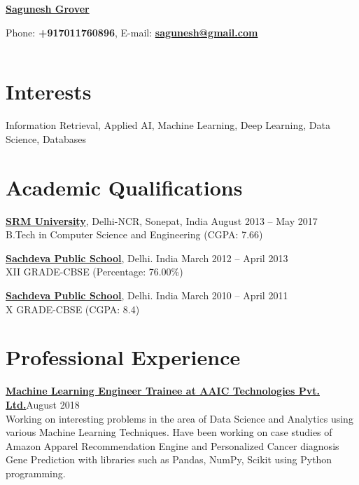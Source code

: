 \documentclass[margin,line]{res}
\begin{document}
\centerline{\LARGE  { \bf \href{https://saguneshgrover.com}{Sagunesh Grover} }} \hfill 
\centerline{{ Phone:}{ \bf +917011760896}, {E-mail:}{{ \href{mailto: sagunesh@gmail.com}{\bf sagunesh@gmail.com}}}\\}

\begin{resume}

\vspace{.005in}
\begin{tabular}{@{}p{3.5in}p{3in}}



\end{tabular}


\section{\sc Interests}

Information Retrieval, Applied AI, Machine Learning, Deep Learning, Data Science, Databases\\

\section{\sc Academic Qualifications}
{\bf \href{http://www.srmuniversity.ac.in}{ SRM University}}, Delhi-NCR, Sonepat, India \hfill August 2013 -- May 2017\\
B.Tech in Computer Science and Engineering \hfill(CGPA: 7.66)

{\bf \href{https://www.spsrohini.com}{ Sachdeva Public School}}, Delhi. India \hfill March 2012 -- April 2013\\
 XII GRADE-CBSE \hfill(Percentage: 76.00\%)

{\bf \href{https://www.spsrohini.com/}{ Sachdeva Public School}}, Delhi. India \hfill March 2010 -- April 2011\\
 X  GRADE-CBSE \hfill(CGPA: 8.4)\\


\section{\sc Professional Experience}
{\bf  \href{https://www.appliedaicourse.com/}{ Machine Learning Engineer Trainee at AAIC Technologies Pvt. Ltd.}}\hfill {August 2018 }\\
Working on interesting problems in the area of Data Science and Analytics using  various  Machine Learning Techniques. Have been working on case studies of Amazon Apparel Recommendation Engine and Personalized Cancer diagnosis Gene Prediction with libraries such as Pandas, NumPy, Scikit using Python programming.


\end{resume}
\end{document}
